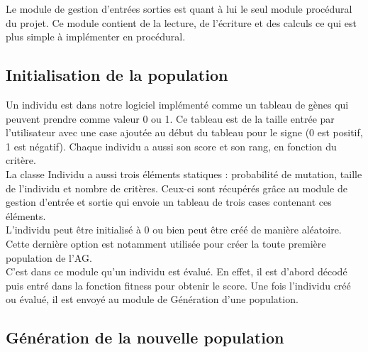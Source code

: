 \documentclass[a4paper,11pt]{article}
\begin{document}
		Le module de gestion d’entrées sorties est quant à lui le seul module procédural du projet. Ce module contient de la lecture, de l’écriture et des calculs ce qui est plus simple à implémenter en procédural. \\
		
		\subsection{Initialisation de la population}
			Un individu est dans notre logiciel implémenté comme un tableau de gènes qui peuvent prendre comme valeur 0 ou 1.
			Ce tableau est de la taille entrée par l’utilisateur avec une case ajoutée au début du tableau pour le signe (0 est positif, 1 est négatif).
			Chaque individu a aussi son score et son rang, en fonction du critère.\\
			La classe Individu a aussi trois éléments statiques : probabilité de mutation, taille de l’individu et nombre de critères.
			Ceux-ci sont récupérés grâce au module de gestion d’entrée et sortie qui envoie un tableau de trois cases contenant ces éléments.\\
			L’individu peut être initialisé à 0 ou bien peut être créé de manière aléatoire. Cette dernière option est notamment utilisée pour créer la toute première population de l’AG.\\
			C’est dans ce module qu’un individu est évalué.
			En effet, il est d’abord décodé puis entré dans la fonction fitness pour obtenir le score.
			Une fois l’individu créé ou évalué, il est envoyé au module de Génération d’une population.
		
		\subsection{Génération de la nouvelle population}
		
\end{document}
